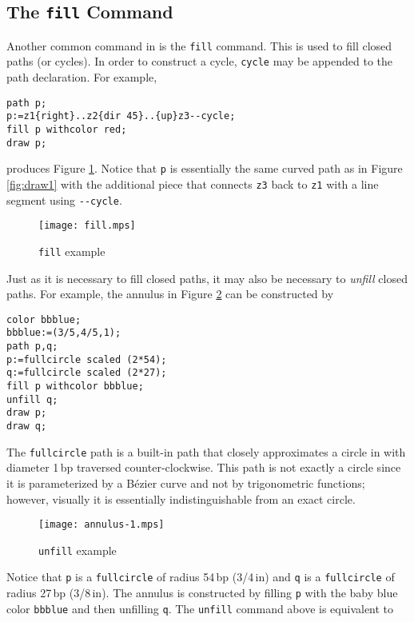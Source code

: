 \subsection{The \texttt{fill} Command}

Another common command in \MP{} is the \texttt{fill} command.  This is
used to fill closed paths (or cycles).  In order to construct a cycle,
\texttt{cycle} may be appended to the path declaration.  For example,

\begin{lstlisting}[xleftmargin=7bp]
path p;
p:=z1{right}..z2{dir 45}..{up}z3--cycle;
fill p withcolor red;
draw p;
\end{lstlisting}
produces Figure \ref{fig:fill}.  Notice that \texttt{p} is essentially
the same curved path as in Figure \ref{fig:draw1} with the additional
piece that connects \texttt{z3} back to \texttt{z1} with a line segment
using \texttt{-{}-cycle}.

\begin{figure}
  \centering
  \texttt{[image: fill.mps]}
  \caption{\texttt{fill} example}
  \label{fig:fill}
\end{figure}

Just as it is necessary to fill closed paths, it may also be necessary
to \textit{unfill} closed paths.  For example, the annulus in Figure
\ref{fig:annulus1} can be constructed by

\begin{lstlisting}[xleftmargin=38bp]
color bbblue;
bbblue:=(3/5,4/5,1);
path p,q;
p:=fullcircle scaled (2*54);
q:=fullcircle scaled (2*27);
fill p withcolor bbblue;
unfill q;
draw p;
draw q;
\end{lstlisting}

The \texttt{fullcircle} path is a built-in path that closely
approximates a circle in \MP{} with diameter 1\,bp traversed
counter-clockwise.  This path is not exactly a circle since it is
parameterized by a B\'{e}zier curve and not by trigonometric functions;
however, visually it is essentially indistinguishable from an exact
circle.

\begin{figure}
  \centering
  \texttt{[image: annulus-1.mps]}
  \caption{\texttt{unfill} example}
  \label{fig:annulus1}
\end{figure}

Notice that \texttt{p} is a \texttt{fullcircle} of radius 54\,bp
(3/4\,in) and \texttt{q} is a \texttt{fullcircle} of radius 27\,bp
(3/8\,in).  The annulus is constructed by filling \texttt{p} with the
baby blue color \texttt{bbblue} and then unfilling \texttt{q}.  The
\texttt{unfill} command above is equivalent to


